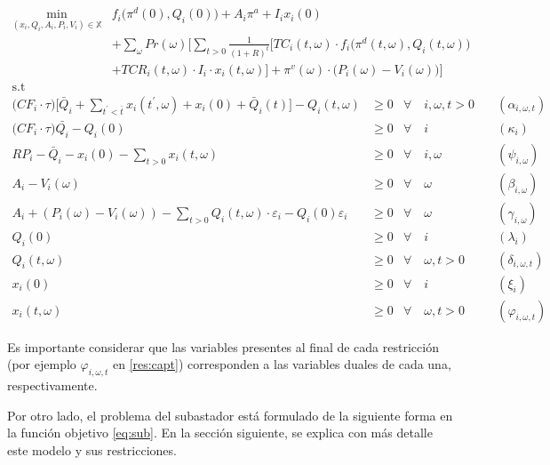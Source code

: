 \begin{align}
\min_{(x_i,Q_i,A_i,P_i,V_i)\in \mathbb{X}} &  f_i \big( \pi^d(0),Q_i(0)\big)+ A_i \pi^{a} + I_i x_i(0) \nonumber \\ 
& + \sum_{\omega} Pr(\omega)   \Bigg[ \sum_{t>0} \frac{1}{(1+R)^t} \Big[ TC_i(t,\omega)\cdot f_i \big( \pi^d(t,\omega),Q_i(t,\omega) \big)  \nonumber \\
 & + TCR_i(t,\omega) \cdot I_i\cdot x_i(t,\omega) \Big] + \pi^v(\omega)\cdot \big(P_i(\omega)-V_i(\omega)\big) \Bigg]  \label{fo:prod}\\
     \textrm{s.t \ } \nonumber
\end{align}
\begin{align}
    \Big(CF_i \cdot\tau\Big)  \Bigg[\bar{Q}_i + \sum_{t^{\prime}<\bar{t}} x_i(t^\prime,\omega) + x_i(0)+ \bar{Q}_i(t) \Bigg] - Q_i(t,\omega) & \geq 0  & \forall  \quad i,\omega, t  > 0 & \quad (\alpha_{i,\omega,t})\label{res:1}\\
    \Big(CF_i\cdot\tau \Big)\bar{Q_i}-Q_{i}(0) & \geq 0  & \forall  \quad i & \quad (\kappa_i) \label{res:2}\\
     RP_i - \bar{Q}_i  - x_i(0) - \sum_{t > 0} x_i(t,\omega) & \geq 0 &  \forall \quad i,\omega &   \quad (\psi_{i,\omega}) \label{res:3}\\
 A_{i} -V_i(\omega) & \geq  0  & \forall  \quad \omega & \quad (\beta_{i,\omega}) \label{res:4}\\
 A_{i} + (P_i(\omega) - V_i(\omega))-\sum_{t>0}Q_i(t, \omega)\cdot \varepsilon_{i}-Q_i(0)\varepsilon_{i} & \geq  0  &\forall \quad \omega & \quad (\gamma_{i,\omega})\label{res:5}\\
 Q_i(0) & \geq  0 & \forall \quad i & \quad (\lambda_i) \label{res:q0}\\ 
 Q_i(t, \omega) & \geq  0   & \forall \quad \omega, t >0 & \quad (\delta_{i,\omega,t})\label{res:qt}\\
  x_i(0) & \geq  0 & \forall  \quad i & \quad (\xi_i)  \label{res:capi0}\\ 
  x_i(t, \omega) & \geq  0   & \forall  \quad \omega, t >0 & \quad (\varphi_{i,\omega,t})\label{res:capt}
  \end{align}

Es importante considerar que las variables presentes al final de cada restricción (por ejemplo $\varphi_{i,\omega,t}$ en \ref{res:capt}) corresponden a las variables duales de cada una, respectivamente.
\vspace{2.5mm}

Por otro lado, el problema del subastador está formulado de la siguiente forma en la función objetivo \ref{eq:sub}. En la sección siguiente, se explica con más detalle este modelo y sus restricciones.

